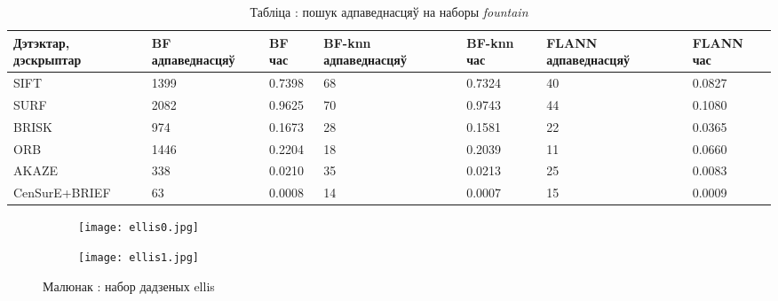 \begin{table}[h]
  \centering
  \begin{footnotesize}
  \begin{tabular}{ | p{20mm} | p{22mm} | p{15mm} | p{22mm} | p{15mm} | p{22mm} | p{15mm} | }
    \hline
    Дэтэктар, дэскрыптар & BF адпаведнасцяў & BF час & BF-knn адпаведнасцяў & BF-knn час & FLANN адпаведнасцяў & FLANN час \\ \hline
    SIFT & 1399 & 0.7398 & 68 & 0.7324 & 40 & 0.0827 \\ \hline
    SURF & 2082 & 0.9625 & 70 & 0.9743 & 44 & 0.1080 \\ \hline
    BRISK & 974 & 0.1673 & 28 & 0.1581 & 22 & 0.0365 \\ \hline
    ORB & 1446 & 0.2204 & 18 & 0.2039 & 11 & 0.0660 \\ \hline
    AKAZE & 338 & 0.0210 & 35 & 0.0213 & 25 & 0.0083 \\ \hline
    CenSurE+\newline BRIEF & 63 & 0.0008 & 14 & 0.0007 & 15 & 0.0009 \\ \hline
  \end{tabular}
  \end{footnotesize}
\captionsetup{labelformat=empty,justification=centering}
\caption{Табліца : пошук адпаведнасцяў на наборы \textit{fountain}}
\label{table:fountain-matching}
\end{table}

\begin{figure}[H]
\centering
\begin{subfigure}{.5\textwidth}
  \centering
  \texttt{[image: ellis0.jpg]}
\end{subfigure}%
\begin{subfigure}{.5\textwidth}
  \centering
  \texttt{[image: ellis1.jpg]}
\end{subfigure}
\captionsetup{labelformat=empty}
\caption{Малюнак : набор дадзеных ellis}
\label{fig:ellis}
\end{figure}

